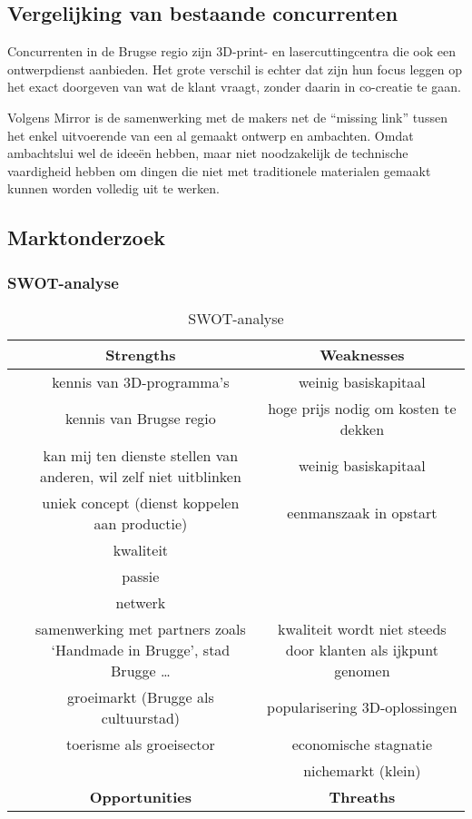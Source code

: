 \subsection{Vergelijking van bestaande concurrenten} %
\label{sub:vergelijing_van_bestaande_concurrenten}

Concurrenten in de Brugse regio zijn 3D-print- en lasercuttingcentra die ook een ontwerpdienst aanbieden. Het grote verschil is echter dat zijn hun focus leggen op het exact doorgeven van wat de klant vraagt, zonder daarin in co-creatie te gaan.

Volgens Mirror is de samenwerking met de makers net de ``missing link'' tussen het enkel uitvoerende van een al gemaakt ontwerp en ambachten. Omdat ambachtslui wel de ideeën hebben, maar niet noodzakelijk de technische vaardigheid hebben om dingen die niet met traditionele materialen gemaakt kunnen worden volledig uit te werken.

\subsection{Marktonderzoek} %
\label{sub:marktonderzoek}

\subsubsection{SWOT-analyse} %
\label{ssub:swot_analyse}

\begin{table}[H]
\caption{SWOT-analyse}\label{table:swot}
\begin{tabulary}{\textwidth}{C|C|C}
& \textbf{Strengths} & \textbf{Weaknesses} \\\hline
{} & kennis van 3D-programma’s & weinig basiskapitaal \\
& kennis van Brugse regio & hoge prijs nodig om kosten te dekken \\
& kan mij ten dienste stellen van anderen, wil zelf niet uitblinken & weinig basiskapitaal \\
& uniek concept (dienst koppelen aan productie) & eenmanszaak in opstart \\
& kwaliteit & \\
& passie & \\
& netwerk & \\\hline
{} & samenwerking met partners zoals `Handmade in Brugge', stad Brugge … & kwaliteit wordt niet steeds door klanten als ijkpunt genomen \\
& groeimarkt (Brugge als cultuurstad) & popularisering 3D-oplossingen \\
& toerisme als groeisector & economische stagnatie \\
& & nichemarkt (klein) \\\hline
& \textbf{Opportunities} & \textbf{Threaths} \\
\end{tabulary}
\end{table}

